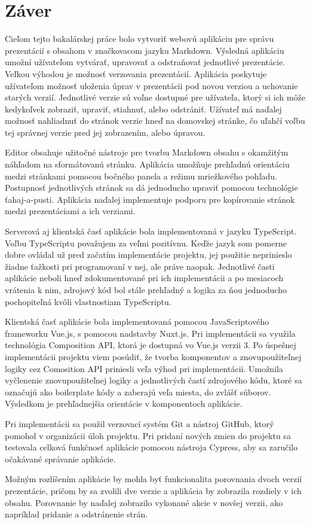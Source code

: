 \chapter{Záver}
\label{kapitola7}
Cieľom tejto bakalárskej práce bolo vytvoriť webovú aplikáciu pre správu prezentácií s obsahom v značkovacom jazyku Markdown. Výsledná aplikáciu umožní užívateľom vytvárať, upravovať a odstraňovať jednotlivé prezentácie. Veľkou výhodou je možnosť verzovania prezentácií. Aplikácia poskytuje užívateľom možnosť uloženia úprav v prezentácii pod novou verziou a uchovanie starých verzií. Jednotlivé verzie sú voľne dostupné pre užívateľa, ktorý si ich môže kedykoľvek zobraziť, upraviť, stiahnuť, alebo odstrániť. Užívateľ má naďalej možnosť nahliadnuť do stránok verzie hneď na domovskej stránke, čo uľahčí voľbu tej správnej verzie pred jej zobrazením, alebo úpravou. 

Editor obsahuje užitočné nástroje pre tvorbu Markdown obsahu s okamžitým náhľadom na sformátovanú stránku. Aplikácia umožňuje prehľadnú orientáciu medzi stránkami pomocou bočného panela a režimu mriežkového pohľadu. Postupnosť jednotlivých stránok sa dá jednoducho upraviť pomocou technológie ťahaj-a-pusti. Aplikácia naďalej implementuje podporu pre kopírovanie stránok medzi prezentáciami a ich verziami.

Serverová aj klientská časť aplikácie bola implementovaná v jazyku TypeScript. Voľbu TypeScriptu považujem za veľmi pozitívnu. Keďže jazyk som pomerne dobre ovládal už pred začatím implementácie projektu, jej použitie neprinieslo žiadne ťažkosti pri programovaní v nej, ale práve naopak. Jednotlivé časti aplikácie neboli hneď zdokumentované pri ich implementácii a po mesiacoch vrátenia k nim, zdrojový kód bol stále prehľadný a logika za ňou jednoducho pochopiteľná kvôli vlastnostiam TypeScriptu. 

Klientská časť aplikácie bola implementovaná pomocou JavaScriptového frameworku Vue.js, s pomocou nadstavby Nuxt.js. Pri implementácii sa využila technológia Composition API, ktorá je dostupná vo Vue.js verzii 3. Po úspešnej implementácii projektu viem posúdiť, že tvorba komponentov a znovupoužiteľnej logiky cez Comosition API priniesli veľa výhod pri implementácii. Umožnila vyčlenenie znovupoužiteľnej logiky a jednotlivých častí zdrojového kódu, ktoré sa označujú ako boilerplate kódy a zaberajú veľa miesta, do zvlášť súborov. Výsledkom je prehľadnejšia orientácie v komponentoch aplikácie. 

Pri implementácii sa použil verzovací systém Git a nástroj GitHub, ktorý pomohol v organizácii úloh projektu. Pri pridaní nových zmien do projektu sa testovala celková funkčnosť aplikácie pomocou nástroja Cypress, aby sa zaručilo očakávané správanie aplikácie.

Možným rozlíšením aplikácie by mohla byť funkcionalita porovnania dvoch verzií prezentácie, pričom by sa zvolili dve verzie a aplikácia by zobrazila rozdiely v ich obsahu. Porovnanie by naďalej zobrazilo vykonané akcie v novšej verzii, ako napríklad pridanie a odstránenie strán.